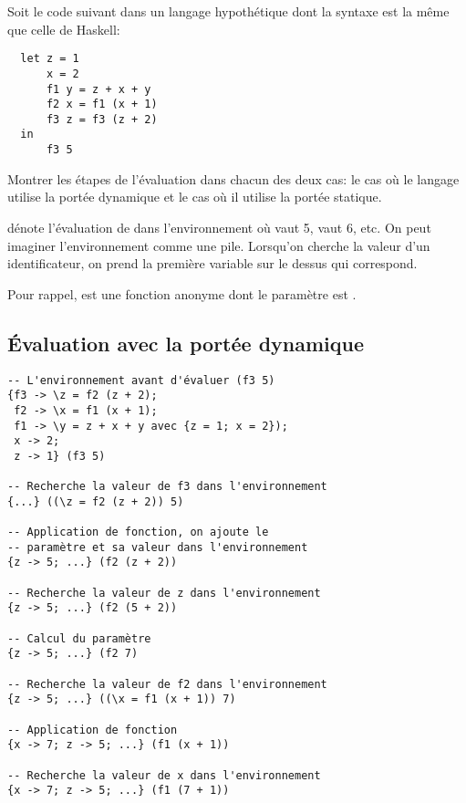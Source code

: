 \begin{Exercise}
  \label{ex:portee_statique_dynamique}
Soit le code suivant dans un langage hypothétique dont la syntaxe est
la même que celle de Haskell: 
\begin{verbatim}
  let z = 1
      x = 2
      f1 y = z + x + y
      f2 x = f1 (x + 1)
      f3 z = f3 (z + 2)
  in
      f3 5    
\end{verbatim}

Montrer les étapes de l'évaluation dans chacun des deux cas: le cas
où le langage utilise la portée dynamique et le cas où il utilise
la portée statique.
\end{Exercise}

\begin{Answer}[ref={ex:portee_statique_dynamique}]
   dénote l'évaluation de 
  dans l'environnement où  vaut 5,  vaut 6, etc.  On
  peut imaginer l'environnement comme une pile. Lorsqu'on cherche la valeur d'un
  identificateur, on prend la première variable sur le dessus qui correspond.
  
  Pour rappel,  est une fonction anonyme dont le
  paramètre est .

  \subsection*{Évaluation avec la portée dynamique}

\begin{verbatim}
-- L'environnement avant d'évaluer (f3 5)
{f3 -> \z = f2 (z + 2);
 f2 -> \x = f1 (x + 1);
 f1 -> \y = z + x + y avec {z = 1; x = 2});
 x -> 2;
 z -> 1} (f3 5)

-- Recherche la valeur de f3 dans l'environnement
{...} ((\z = f2 (z + 2)) 5)

-- Application de fonction, on ajoute le
-- paramètre et sa valeur dans l'environnement
{z -> 5; ...} (f2 (z + 2))

-- Recherche la valeur de z dans l'environnement
{z -> 5; ...} (f2 (5 + 2))

-- Calcul du paramètre
{z -> 5; ...} (f2 7)

-- Recherche la valeur de f2 dans l'environnement
{z -> 5; ...} ((\x = f1 (x + 1)) 7)

-- Application de fonction
{x -> 7; z -> 5; ...} (f1 (x + 1))

-- Recherche la valeur de x dans l'environnement
{x -> 7; z -> 5; ...} (f1 (7 + 1)) 


\end{verbatim}
\end{Answer}
